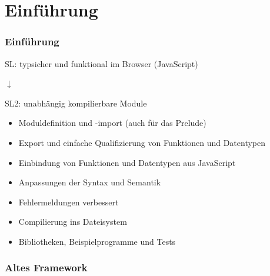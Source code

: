 \section{Einführung}

\begin{frame}
\frametitle{Einführung}
SL: typsicher und funktional im Browser (JavaScript)

\begin{center}
$\downarrow$
\end{center}

SL2: unabhängig kompilierbare Module

\begin{itemize}
\item Moduldefinition und -import (auch für das Prelude)
\item Export und einfache Qualifizierung von Funktionen und
    Datentypen
\item Einbindung von Funktionen und Datentypen aus JavaScript
\item Anpassungen der Syntax und Semantik
\item Fehlermeldungen verbessert
\item Compilierung ins Dateisystem
\item Bibliotheken, Beispielprogramme und Tests
\end{itemize}
\end{frame}

\begin{frame}
\frametitle{Altes Framework}

\begin{figure}
\end{figure}

\end{frame}


